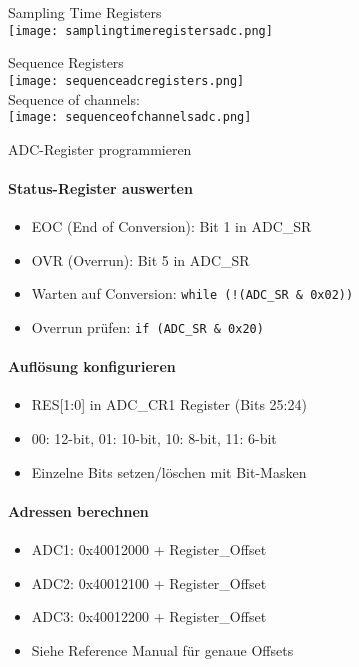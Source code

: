 \begin{corollary}{Sampling Time Registers}\\
    \texttt{[image: samplingtimeregistersadc.png]}    
\end{corollary}

\begin{corollary}{Sequence Registers}\\
    \texttt{[image: sequenceadcregisters.png]}\\
    Sequence of channels:\\
    \texttt{[image: sequenceofchannelsadc.png]}
\end{corollary}

\begin{concept}{ADC-Register programmieren}
    \paragraph{Status-Register auswerten}
    \begin{itemize}
        \item EOC (End of Conversion): Bit 1 in ADC\_SR
        \item OVR (Overrun): Bit 5 in ADC\_SR
        \item Warten auf Conversion: \texttt{while (!(ADC\_SR \& 0x02))}
        \item Overrun prüfen: \texttt{if (ADC\_SR \& 0x20)}
    \end{itemize}
    
    \paragraph{Auflösung konfigurieren}
    \begin{itemize}
        \item RES[1:0] in ADC\_CR1 Register (Bits 25:24)
        \item 00: 12-bit, 01: 10-bit, 10: 8-bit, 11: 6-bit
        \item Einzelne Bits setzen/löschen mit Bit-Masken
    \end{itemize}
    
    \paragraph{Adressen berechnen}
    \begin{itemize}
        \item ADC1: 0x40012000 + Register\_Offset
        \item ADC2: 0x40012100 + Register\_Offset  
        \item ADC3: 0x40012200 + Register\_Offset
        \item Siehe Reference Manual für genaue Offsets
    \end{itemize}
    

\end{concept}
